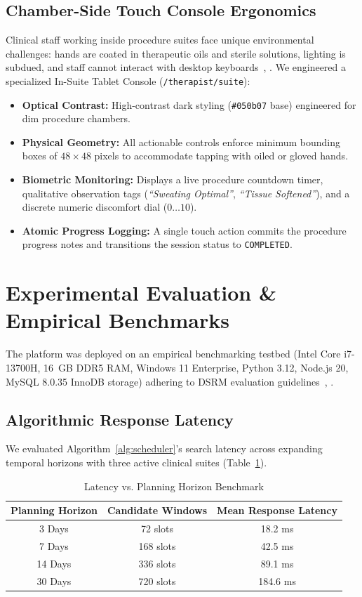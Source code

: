 \documentclass[conference]{IEEEtran}
\begin{document}
\subsection{Chamber-Side Touch Console Ergonomics}
Clinical staff working inside procedure suites face unique environmental challenges: hands are coated in therapeutic oils and sterile solutions, lighting is subdued, and staff cannot interact with desktop keyboards~\cite{singh2008holistic}, \cite{mamlin2006cooking}. We engineered a specialized In-Suite Tablet Console (\texttt{/therapist/suite}):
\begin{itemize}
    \item \textbf{Optical Contrast:} High-contrast dark styling (\texttt{\#050b07} base) engineered for dim procedure chambers.
    \item \textbf{Physical Geometry:} All actionable controls enforce minimum bounding boxes of $48 \times 48$ pixels to accommodate tapping with oiled or gloved hands.
    \item \textbf{Biometric Monitoring:} Displays a live procedure countdown timer, qualitative observation tags (\textit{``Sweating Optimal''}, \textit{``Tissue Softened''}), and a discrete numeric discomfort dial ($0 \dots 10$).
    \item \textbf{Atomic Progress Logging:} A single touch action commits the procedure progress notes and transitions the session status to \texttt{COMPLETED}.
\end{itemize}

\section{Experimental Evaluation \& Empirical Benchmarks}

The platform was deployed on an empirical benchmarking testbed (Intel Core i7-13700H, 16~GB DDR5 RAM, Windows 11 Enterprise, Python 3.12, Node.js 20, MySQL 8.0.35 InnoDB storage) adhering to DSRM evaluation guidelines~\cite{peffers2007design}, \cite{hevner2004design}.

\subsection{Algorithmic Response Latency}
We evaluated Algorithm~\ref{alg:scheduler}'s search latency across expanding temporal horizons with three active clinical suites (Table~\ref{tab:benchmarks}).

\begin{table}[h]
\centering
\caption{Latency vs. Planning Horizon Benchmark}
\label{tab:benchmarks}
\begin{tabular}{@{}ccc@{}}
\toprule
\textbf{Planning Horizon} & \textbf{Candidate Windows} & \textbf{Mean Response Latency} \\
\midrule
3 Days & 72 slots & 18.2 ms \\
7 Days & 168 slots & 42.5 ms \\
14 Days & 336 slots & 89.1 ms \\
30 Days & 720 slots & 184.6 ms \\
\bottomrule
\end{tabular}
\end{table}
\end{document}

